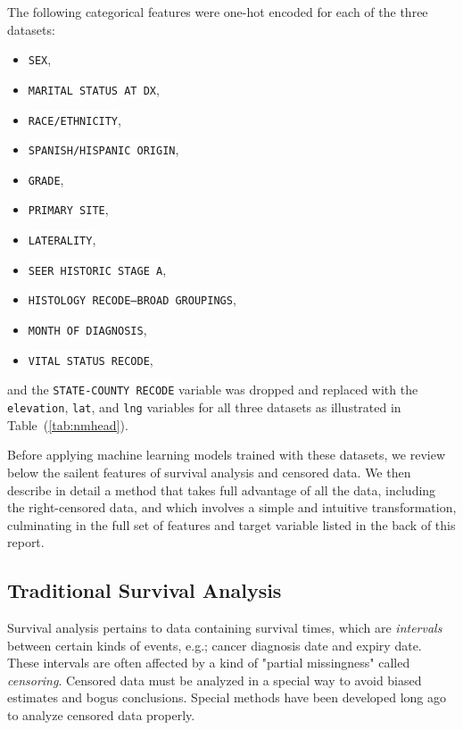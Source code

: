 \documentclass[10pt,letterpaper]{article}
\newcommand{\codewhite}[1]{\colorbox{white}{\texttt{#1}}}
\begin{document}
The following categorical features were one-hot encoded for each of the three datasets:

\begin{itemize}[noitemsep]
\item \codewhite{SEX},
\item  \codewhite{MARITAL STATUS AT DX},
\item \codewhite{RACE/ETHNICITY},
\item \codewhite{SPANISH/HISPANIC ORIGIN},
\item \codewhite{GRADE},
\item \codewhite{PRIMARY SITE},
\item \codewhite{LATERALITY},
\item \codewhite{SEER HISTORIC STAGE A},
\item \codewhite{HISTOLOGY RECODE--BROAD GROUPINGS},
\item \codewhite{MONTH OF DIAGNOSIS},
\item  \codewhite{VITAL STATUS RECODE},
\end{itemize}
and the \codewhite{STATE-COUNTY RECODE} variable was dropped and replaced with the \codewhite{elevation}, \codewhite{lat}, and \codewhite{lng} variables for all three datasets as illustrated in Table~(\ref{tab:nmhead}).

Before applying machine learning models trained with these datasets, we review below the sailent features of survival analysis and censored data. We then describe in detail a method that takes full advantage of all the data, including the right-censored data, and which involves a simple and intuitive transformation, culminating in the full set of features and target variable listed in the back of this report.


\subsection*{Traditional Survival Analysis}
\label{subsec:survprimer}

Survival analysis pertains to data containing survival times, which are \emph{intervals} between certain kinds of events, e.g.; cancer diagnosis date and expiry date. These intervals are often affected by a kind of "partial missingness" called \emph{censoring}. Censored data must be analyzed in a special way to avoid biased estimates and bogus conclusions.
Special methods have been developed long ago to analyze censored data properly.
\end{document}
